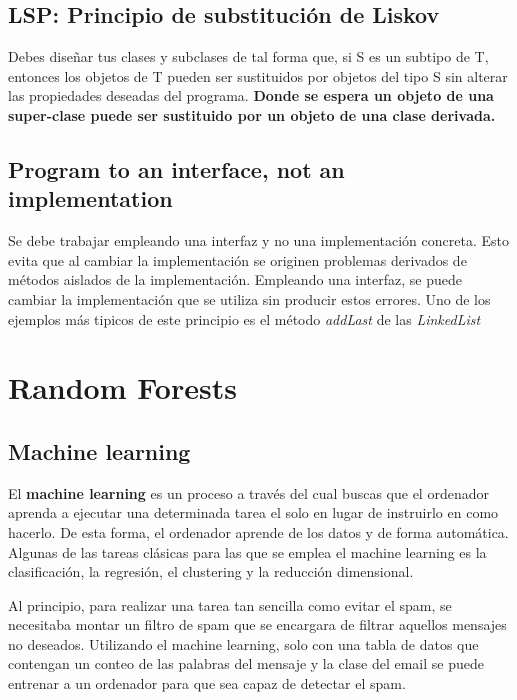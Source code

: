 \documentclass[11pt]{article}
\theoremstyle{plain}
\begin{document}
       \subsection{LSP: Principio de substitución de Liskov} %
        \label{sub:lsp_principio_de_substitucion_de_liskov}
            Debes diseñar tus clases y subclases de tal forma que, si S es un subtipo de T, entonces los objetos de T pueden ser sustituidos por objetos del tipo S sin alterar las propiedades deseadas del programa. \textbf{Donde se espera un objeto de una super-clase puede ser sustituido por un objeto de una clase derivada.}
        \subsection{Program to an interface, not an implementation} %
        \label{sub:program_to_an_interface_not_an_implementation}
        Se debe trabajar empleando una interfaz y no una implementación concreta. Esto evita que al cambiar la implementación se originen problemas derivados de métodos aislados de la implementación. Empleando una interfaz, se puede cambiar la implementación que se utiliza sin producir estos errores. Uno de los ejemplos más tipicos de este principio es el método \textit{addLast} de las \textit{LinkedList}
    \section{Random Forests} %
    \label{sec:random_forests}
        \subsection{Machine learning} %
        \label{sub:machine_learning}
            El \textbf{machine learning} es un proceso a través del cual buscas que el ordenador aprenda a ejecutar una determinada tarea el solo en lugar de instruirlo en como hacerlo. De esta forma, el ordenador aprende de los datos y de forma automática. Algunas de las tareas clásicas para las que se emplea el machine learning es la clasificación, la regresión, el clustering y la reducción dimensional.

            Al principio, para realizar una tarea tan sencilla como evitar el spam, se necesitaba montar un filtro de spam que se encargara de filtrar aquellos mensajes no deseados. Utilizando el machine learning, solo con una tabla de datos que contengan un conteo de las palabras del mensaje y la clase del email se puede entrenar a un ordenador para que sea capaz de detectar el spam.
\end{document}

